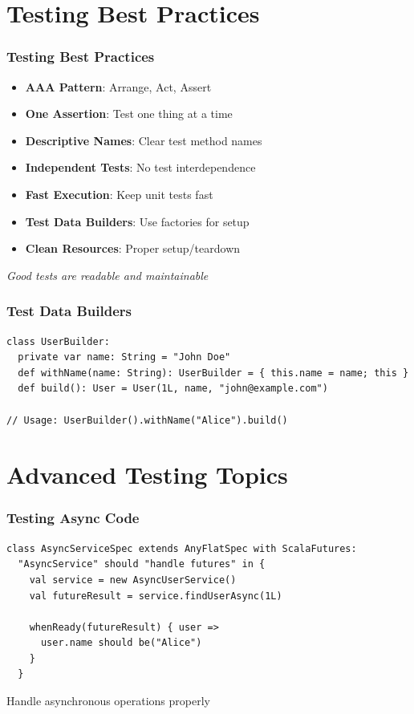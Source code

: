 \documentclass{beamer}
\begin{document}
\section{Testing Best Practices}

\begin{frame}
\frametitle{Testing Best Practices}

\begin{itemize}
  \item \textbf{AAA Pattern}: Arrange, Act, Assert
  \item \textbf{One Assertion}: Test one thing at a time
  \item \textbf{Descriptive Names}: Clear test method names
  \item \textbf{Independent Tests}: No test interdependence
  \item \textbf{Fast Execution}: Keep unit tests fast
  \item \textbf{Test Data Builders}: Use factories for setup
  \item \textbf{Clean Resources}: Proper setup/teardown
\end{itemize}

\vspace{0.3cm}
\textit{Good tests are readable and maintainable}

\end{frame}

\begin{frame}[fragile]
\frametitle{Test Data Builders}

\begin{lstlisting}[style=scalaStyle]
class UserBuilder:
  private var name: String = "John Doe"
  def withName(name: String): UserBuilder = { this.name = name; this }
  def build(): User = User(1L, name, "john@example.com")

// Usage: UserBuilder().withName("Alice").build()
\end{lstlisting}

\end{frame}

\section{Advanced Testing Topics}

\begin{frame}[fragile]
\frametitle{Testing Async Code}

\begin{lstlisting}[style=scalaStyle]
class AsyncServiceSpec extends AnyFlatSpec with ScalaFutures:
  "AsyncService" should "handle futures" in {
    val service = new AsyncUserService()
    val futureResult = service.findUserAsync(1L)
    
    whenReady(futureResult) { user =>
      user.name should be("Alice")
    }
  }
\end{lstlisting}

Handle asynchronous operations properly

\end{frame}
\end{document}
